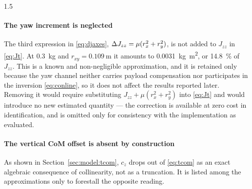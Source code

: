 \begin{spacing}{1.5}
\paragraph{The yaw increment is neglected} The third expression in
\eqref{eq:djaxes}, $\Delta J_{zz} = \mu(r_x^2 + r_y^2)$, is not added to
$J_{zz}$ in \eqref{eq:Jt}. At \SI{0.3}{\kg} and
$r_{xy} = \SI{0.109}{\meter}$ it amounts to
\SI{0.0031}{\kg\meter\squared}, or \SI{14.8}{\percent} of $J_{zz}$. This
is a known and non-negligible approximation, and it is retained only
because the yaw channel neither carries payload compensation nor
participates in the inversion \eqref{eq:conline}, so it does not affect
the results reported later. Removing it would require substituting
$J_{zz} + \mu(r_x^2 + r_y^2)$ into \eqref{eq:Jt} and would introduce no
new estimated quantity --- the correction is available at zero cost in
identification, and is omitted only for consistency with the
implementation as evaluated.

\paragraph{The vertical CoM offset is absent by construction} As shown in
Section~\ref{sec:model:tcom}, $c_z$ drops out of \eqref{eq:tcom} as an
exact algebraic consequence of collinearity, not as a truncation. It is
listed among the approximations only to forestall the opposite reading.

\end{spacing}
\newpage
